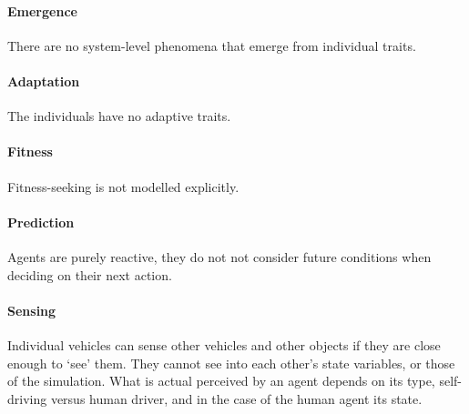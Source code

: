 

\paragraph{Emergence} 
There are no system-level phenomena that emerge from individual traits.

\paragraph{Adaptation} 
The individuals have no adaptive traits.

\paragraph{Fitness} 
Fitness-seeking is not modelled explicitly. 

\paragraph{Prediction} 
Agents are purely reactive, they do not not consider future conditions when deciding on their next action.  

\paragraph{Sensing} 
Individual vehicles can sense other vehicles and other objects if they are close enough to `see' them. They cannot see into each other's state variables, or those of the simulation. What is actual perceived by an agent depends on its type, self-driving versus human driver, and in the case of the human agent its state.

